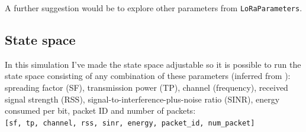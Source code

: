 A further suggestion would be to explore other parameters from \texttt{LoRaParameters}.

\subsection{State space}
In this simulation I've made the state space adjustable 
so it is possible to run the state space consisting of any 
combination of these parameters (inferred from
\cite{rl_lora_original}): spreading factor (SF), 
transmission power (TP), channel (frequency), received signal
strength (RSS), signal-to-interference-plus-noise ratio (SINR),
energy consumed per bit, packet ID and number of packets:\\
\texttt{[sf, tp, channel, rss, sinr, energy, packet\_id, num\_packet]}






